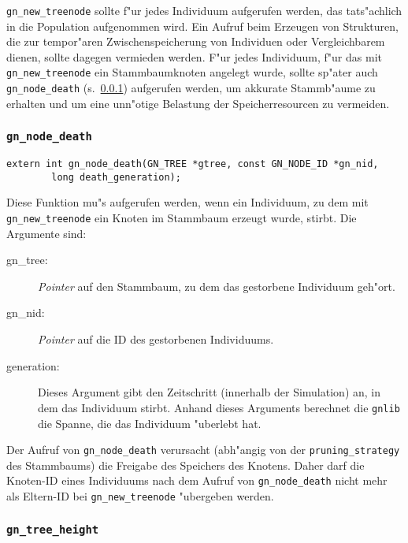 \documentclass[a4paper, fleqn]{article}
\begin{document}
\verb|gn_new_treenode| sollte f"ur jedes Individuum aufgerufen werden, das
tats"achlich in die Population aufgenommen wird. Ein Aufruf beim Erzeugen von
Strukturen, die zur tempor"aren Zwischenspeicherung von Individuen oder
Vergleichbarem dienen, sollte dagegen vermieden werden. F"ur jedes Individuum,
f"ur das mit \verb|gn_new_treenode| ein Stammbaumknoten angelegt wurde, sollte
sp"ater auch \verb|gn_node_death| (s.\ \ref{gn_node_death}) aufgerufen werden,
um akkurate Stammb"aume zu erhalten und um eine unn"otige Belastung der
Speicherresourcen zu vermeiden.


\subsubsection{\texttt{gn\_node\_death}}
\label{gn_node_death}

\begin{verbatim}
extern int gn_node_death(GN_TREE *gtree, const GN_NODE_ID *gn_nid,
        long death_generation);
\end{verbatim}

Diese Funktion mu"s aufgerufen werden, wenn ein Individuum, zu dem mit
\verb|gn_new_treenode| ein Knoten im Stammbaum erzeugt wurde, stirbt. Die
Argumente sind:

\begin{description}

\item[gn\_tree:] \textsl{Pointer} auf den Stammbaum, zu dem das gestorbene
    Individuum geh"ort.

\item[gn\_nid:] \textsl{Pointer} auf die ID des gestorbenen Individuums.

\item[generation:] Dieses Argument gibt den Zeitschritt (innerhalb der Simulation)
    an, in dem das Individuum stirbt. Anhand dieses Arguments berechnet
    die \texttt{gnlib} die Spanne, die das Individuum "uberlebt hat.

\end{description}

Der Aufruf von \verb|gn_node_death| verursacht (abh"angig von der
\verb|pruning_strategy| des Stammbaums) die Freigabe des Speichers
des Knotens. Daher darf die Knoten-ID eines Individuums nach dem Aufruf
von \verb|gn_node_death| nicht mehr als Eltern-ID bei \verb|gn_new_treenode|
"ubergeben werden.


\subsubsection{\texttt{gn\_tree\_height}}
\label{gn_tree_height}
\end{document}
